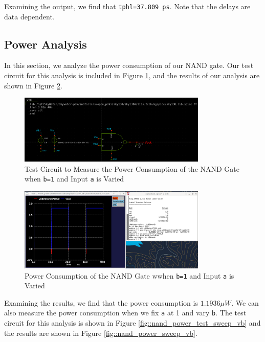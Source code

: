 \documentclass[fleqn]{article}
\begin{document}
	Examining the output, we find that \texttt{tphl=37.809 ps}. Note that the delays are data dependent.
	
	\subsection{Power Analysis}
	
	In this section, we analyze the power consumption of our NAND gate. Our test circuit for this analysis is included in Figure \ref{fig::nand_power_test_sweep_va}, and the results of our analysis are shown in Figure \ref{fig::nand_power_sweep_va}.
	
	\begin{figure}[H]
		\centerline{\includegraphics[width=0.8\textwidth]{nand_power_test_sweep_va.png}}
		\caption{Test Circuit to Measure the Power Consumption of the NAND Gate when \texttt{b=1} and Input \texttt{a} is Varied}
		\label{fig::nand_power_test_sweep_va}
	\end{figure}
	
	\begin{figure}[H]
		\centerline{\includegraphics[width=0.8\textwidth]{nand_power_sweep_va.png}}
		\caption{Power Consumption of the NAND Gate wwhen \texttt{b=1} and Input \texttt{a} is Varied}
		\label{fig::nand_power_sweep_va}
	\end{figure}
	
	Examining the results, we find that the power consumption is $1.1936{\mu}W$. We can also measure the power consumption when we fix \texttt{a} at 1 and vary \texttt{b}. The test circuit for this analysis is shown in Figure \ref{fig::nand_power_test_sweep_vb} and the results are shown in Figure \ref{fig::nand_power_sweep_vb}.
	
\end{document}
